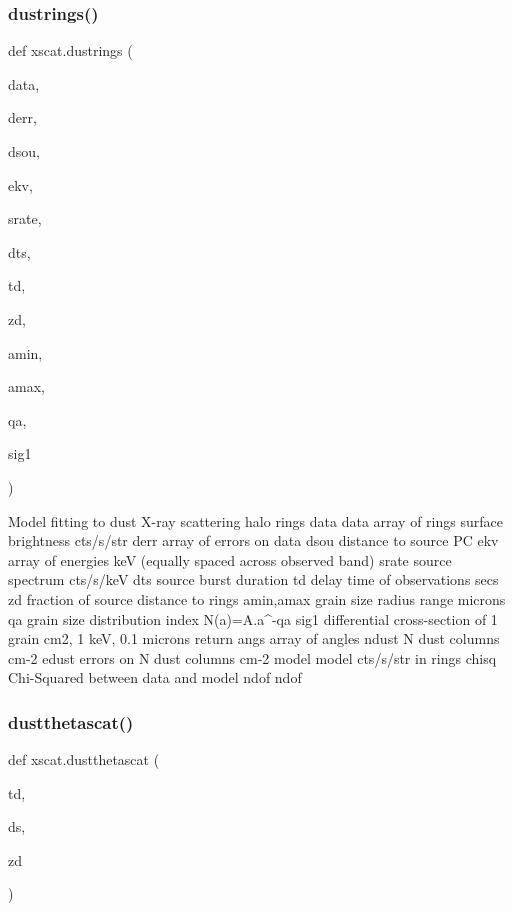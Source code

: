 \subsubsection{\texorpdfstring{dustrings()}{dustrings()}}
{\footnotesize\ttfamily def xscat.\+dustrings (\begin{DoxyParamCaption}\item[{}]{data,  }\item[{}]{derr,  }\item[{}]{dsou,  }\item[{}]{ekv,  }\item[{}]{srate,  }\item[{}]{dts,  }\item[{}]{td,  }\item[{}]{zd,  }\item[{}]{amin,  }\item[{}]{amax,  }\item[{}]{qa,  }\item[{}]{sig1 }\end{DoxyParamCaption})}

\begin{DoxyVerb}Model fitting to dust X-ray scattering halo rings
    data       data array of rings surface brightness cts/s/str
    derr       array of errors on data
    dsou       distance to source PC
    ekv        array of energies keV (equally spaced across observed band)
    srate      source spectrum cts/s/keV
    dts        source burst duration
    td         delay time of observations secs
    zd         fraction of source distance to rings
    amin,amax  grain size radius range microns
    qa         grain size distribution index N(a)=A.a^-qa
    sig1       differential cross-section of 1 grain cm2, 1 keV, 0.1 microns
return 
    angs       array of angles
    ndust      N dust columns cm-2
    edust      errors on N dust columns cm-2
    model      model cts/s/str in rings
    chisq      Chi-Squared between data and model
    ndof       ndof
\end{DoxyVerb}
 \mbox{\label{namespacexscat_a30a3faecca5dc0a525a60089fb6b85b6}} 
\subsubsection{\texorpdfstring{dustthetascat()}{dustthetascat()}}
{\footnotesize\ttfamily def xscat.\+dustthetascat (\begin{DoxyParamCaption}\item[{}]{td,  }\item[{}]{ds,  }\item[{}]{zd }\end{DoxyParamCaption})}

